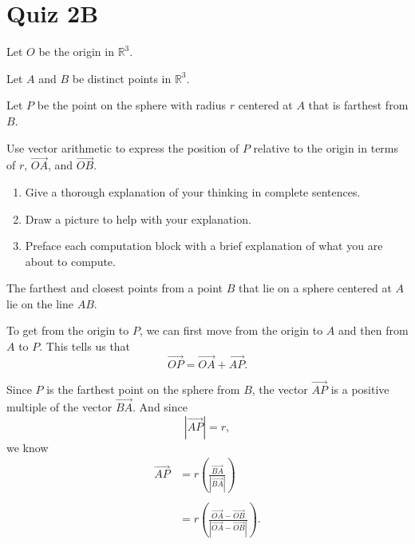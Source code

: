 \documentclass{ximera}
\begin{document}
\section{Quiz 2B}

\begin{question} \label{Q2Bdfd}

\item Let $O$ be the origin in $\mathbb{R}^3$.

Let $A$ and $B$ be distinct points in $\mathbb{R}^3$.

Let $P$ be the point on the sphere with radius $r$ centered at $A$ that is farthest from $B$.

Use vector arithmetic to express the position of $P$ relative to the origin in terms of $r$, $\overrightarrow{OA}$, and $\overrightarrow{OB}$.

\begin{enumerate}

\item Give a thorough explanation of your thinking in complete sentences.

\item Draw a picture to help with your explanation.

\item Preface each computation block with a brief explanation of what you are about to compute.

\end{enumerate}

\begin{explanation}
The farthest and closest points from a point $B$ that lie on a sphere centered at $A$ lie on the line $AB$. %

To get from the origin to $P$, we can first move from the origin to $A$ and then from $A$ to $P$. This tells us that
\[
      \overrightarrow{OP} = \overrightarrow{OA} +\overrightarrow{AP}.
\]

Since $P$ is the farthest point on the sphere from $B$, the vector $\overrightarrow{AP}$ is a positive multiple of the vector $\overrightarrow{BA}$. And since 
\[
   \left| \overrightarrow{AP} \right| = r,
\]
we know
\begin{align*}
        \overrightarrow{AP} &=  r \left( \frac{\overrightarrow{BA}}{|\overrightarrow{BA}|}  \right)  \\ \\
                                      &=  r \left( \frac{\overrightarrow{OA} - \overrightarrow{OB}}{|\overrightarrow{OA} - \overrightarrow{OB}|}  \right) .
\end{align*}


\end{explanation}
\end{question}
\end{document}
